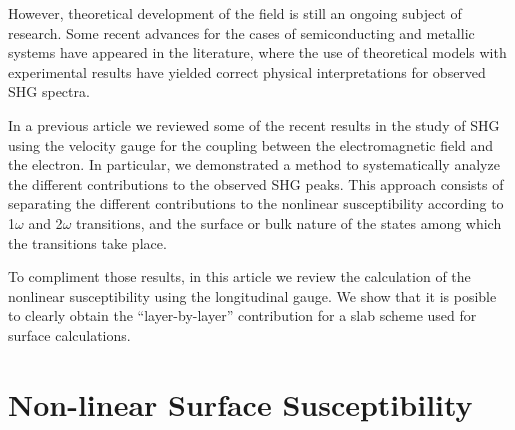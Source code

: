 \documentclass[floatfix,prb,aps,superscriptaddress,11pt,preprint,letterpaper]{revtex4}
\begin{document}
However, theoretical development of the field is still an ongoing 
subject of research. Some recent advances for the cases of semiconducting 
and metallic systems have appeared in the literature, where the use of 
theoretical models with experimental results have yielded correct 
physical interpretations for observed SHG spectra.
\cite{
downer_optical_2001,
mendoza_ab_2001,
lim_optical_2000,
gavrilenko_optical_2000,
mendoza_visible-infrared_1999,
mendozaPRL98,
mendozaPRB96,
mendoza_polarizable-bond_1997,
guyotPRB90} 

In a previous article\cite{mendoza_epioptics_2001} we reviewed some 
of the recent results in the study of SHG using the velocity gauge 
for the coupling between the electromagnetic field and the electron. 
In particular, we demonstrated a method to systematically analyze the 
different contributions to the observed SHG peaks.\cite{arzatePRB01} 
This approach consists of separating the different contributions to 
the nonlinear susceptibility according to 1$\omega$ and 2$\omega$ 
transitions, and the surface or bulk nature of the states among 
which the transitions take place. 

To compliment those results, in this article we review the calculation 
of the nonlinear susceptibility using the longitudinal gauge. We show 
that it is posible to clearly obtain the ``layer-by-layer'' contribution 
for a slab scheme used for surface calculations.

\section{Non-linear Surface Susceptibility}\label{nonchi}
\end{document}
